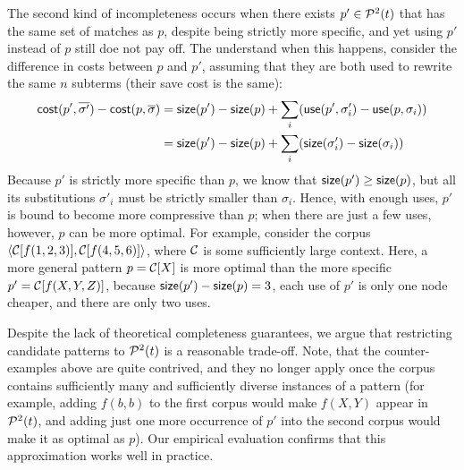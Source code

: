 The second kind of incompleteness occurs when there exists $p' \in \mathcal{P}^2(t)$
that has the same set of matches as $p$, despite being strictly more specific,
and yet using $p'$ instead of $p$ still doe not pay off.
%
The understand when this happens, consider the difference in costs between $p$ and $p'$, 
assuming that they are both used to rewrite the same $n$ subterms
(\ie their \textsf{save} cost is the same):
\begin{align*}
  \mathsf{cost}(p', \overline{\sigma'}) - \mathsf{cost}(p, \overline{\sigma}) &= \mathsf{size}(p') - \mathsf{size}(p) + \sum_i (\mathsf{use}(p', \sigma'_i) - \mathsf{use}(p, \sigma_i))\\
  &= \mathsf{size}(p') - \mathsf{size}(p) + \sum_i (\mathsf{size}(\sigma'_i) - \mathsf{size}(\sigma_i))
\end{align*}
%
Because $p'$ is strictly more specific than $p$, we know that $\mathsf{size}(p') \geq \mathsf{size}(p)$,
but all its substitutions $\sigma'_i$ must be strictly smaller than $\sigma_i$.
%
Hence, with enough uses, $p'$ is bound to become more compressive than $p$;
when there are just a few uses, however, $p$ can be more optimal.
%
For example, consider the corpus $\langle \mathcal{C}[f(1,2,3)],  \mathcal{C}[f(4,5,6)]\rangle$,
where $\mathcal{C}$ is some sufficiently large context.
%
Here, a more general pattern $p = \mathcal{C}[X]$ is more optimal than the more specific $p' = \mathcal{C}[f(X,Y,Z)]$,
because $\mathsf{size}(p') - \mathsf{size}(p) = 3$, each use of $p'$ is only one node cheaper,
and there are only two uses. 

Despite the lack of theoretical completeness guarantees, 
we argue that restricting candidate patterns to $\mathcal{P}^2(t)$ is a reasonable trade-off.
%
Note, that the counter-examples above are quite contrived,
and they no longer apply once the corpus contains sufficiently many and sufficiently diverse instances of a pattern
(for example, adding $f(b,b)$ to the first corpus would make $f(X,Y)$ appear in $\mathcal{P}^2(t)$,
and adding just one more occurrence of $p'$ into the second corpus would make it as optimal as $p$).
%
Our empirical evaluation confirms that this approximation works well in practice.




